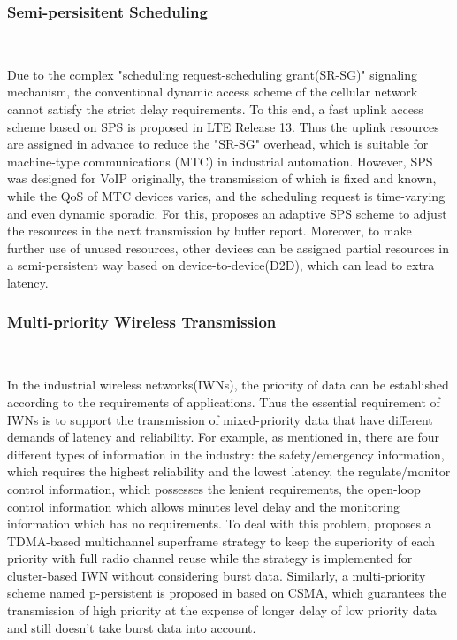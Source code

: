 \documentclass{SCIS2021}
\begin{document}
	\subsubsection{Semi-persisitent Scheduling}~{}

	Due to the complex "scheduling request-scheduling grant(SR-SG)" signaling mechanism, the conventional dynamic access scheme of the cellular network cannot satisfy the strict delay requirements\cite{holfeld2016wireless}. To this end, a fast uplink access scheme based on SPS is proposed in LTE Release 13\cite{3gpp2010}. Thus the uplink resources are assigned in advance to reduce the "SR-SG" overhead, which is suitable for machine-type communications (MTC) in industrial automation\cite{schulz2017latency}. However, SPS was designed for VoIP originally, the transmission of which is fixed and known, while the QoS of MTC devices varies, and the scheduling request is time-varying and even dynamic sporadic\cite{seo2012performance}. For this, \cite{afrin2015design} proposes an adaptive SPS scheme to adjust the resources in the next transmission by buffer report. Moreover, to make further use of unused resources, other devices can be assigned partial resources in a semi-persistent way based on device-to-device(D2D), which can lead to extra latency\cite{soleymani2016hierarchical}.

	\subsubsection{Multi-priority Wireless Transmission}~{}


	In the industrial wireless networks(IWNs), the priority of data can be established according to the requirements of applications\cite{raza2018novel}. Thus the essential requirement of IWNs is to support the transmission of mixed-priority data that have different demands of latency and reliability\cite{farag2018priority,gaj2012computer}. For example, as mentioned in\cite{zand2012wireless}, there are four different types of information in the industry: the safety/emergency information, which requires the highest reliability and the lowest latency, the regulate/monitor control information, which possesses the lenient requirements, the open-loop control information which allows minutes level delay and the monitoring information which has no requirements. To deal with this problem, \cite{lin2019framework} proposes a TDMA-based multichannel superframe strategy to keep the superiority of each priority with full radio channel reuse while the strategy is implemented for cluster-based IWN without considering burst data. Similarly, a multi-priority scheme named p-persistent is proposed in\cite{hang2020delay} based on CSMA, which guarantees the transmission of high priority at the expense of longer delay of low priority data and still doesn't take burst data into account.
\end{document}
